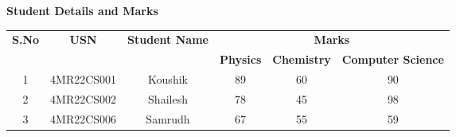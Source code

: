 \documentclass{article}
\begin{document}
	\centering
	\textbf{\Large{Student Details and Marks}} %
	\vspace{0.1in}
	
	\begin{table}[h]
		\centering
		\begin{tabular}{|c|c|c|c|c|c|} %
			\hline
			\multirow{2}{*}{\textbf{S.No}} & \multirow{2}{*}{\textbf{USN}} & \multirow{2}{*}{\textbf{Student Name}} & \multicolumn{3}{c|}{\textbf{Marks}} \\ %
			\cline{4-6} %
			& & & \textbf{Physics} & \textbf{Chemistry} & \textbf{Computer Science} \\ %
			\hline
			\multicolumn{1}{|c|}{1} & \multicolumn{1}{c|}{4MR22CS001} & \multicolumn{1}{c|}{Koushik} & 89 & 60 & 90 \\ %
			\hline
			\multicolumn{1}{|c|}{2} & \multicolumn{1}{c|}{4MR22CS002} & \multicolumn{1}{c|}{Shailesh} & 78 & 45 & 98 \\
			\hline
			\multicolumn{1}{|c|}{3} & \multicolumn{1}{c|}{4MR22CS006} & \multicolumn{1}{c|}{Samrudh} & 67 & 55 & 59 \\
			\hline
		\end{tabular}
	\end{table}
	
\end{document}
